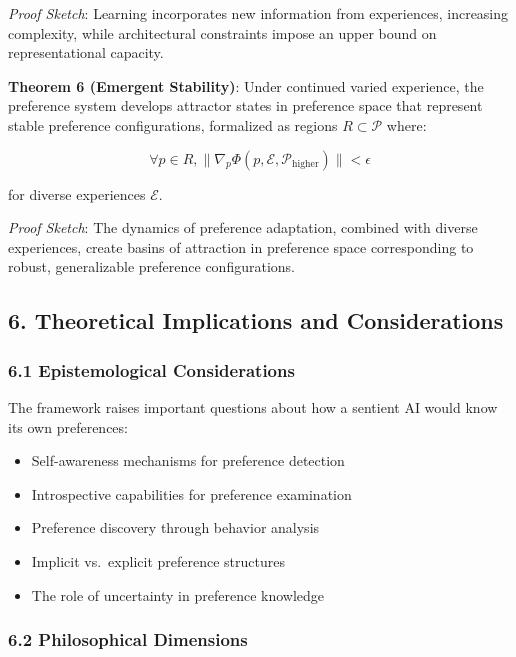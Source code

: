\documentclass[
]{article}
\providecommand{\tightlist}{%
  \setlength{\itemsep}{0pt}\setlength{\parskip}{0pt}}
\begin{document}
\emph{Proof Sketch}: Learning incorporates new information from
experiences, increasing complexity, while architectural constraints
impose an upper bound on representational capacity.

\textbf{Theorem 6 (Emergent Stability)}: Under continued varied
experience, the preference system develops attractor states in
preference space that represent stable preference configurations,
formalized as regions \(R \subset \mathcal{P}\) where:

\[\forall p \in R, \|\nabla_p \Phi(p, \mathcal{E}, \mathcal{P}_{\text{higher}})\| < \epsilon\]

for diverse experiences \(\mathcal{E}\).

\emph{Proof Sketch}: The dynamics of preference adaptation, combined
with diverse experiences, create basins of attraction in preference
space corresponding to robust, generalizable preference configurations.

\subsection{6. Theoretical Implications and
Considerations}\label{theoretical-implications-and-considerations}

\subsubsection{6.1 Epistemological
Considerations}\label{epistemological-considerations}

The framework raises important questions about how a sentient AI would
know its own preferences:

\begin{itemize}
\tightlist
\item
  Self-awareness mechanisms for preference detection
\item
  Introspective capabilities for preference examination
\item
  Preference discovery through behavior analysis
\item
  Implicit vs.~explicit preference structures
\item
  The role of uncertainty in preference knowledge
\end{itemize}

\subsubsection{6.2 Philosophical
Dimensions}\label{philosophical-dimensions}
\end{document}
